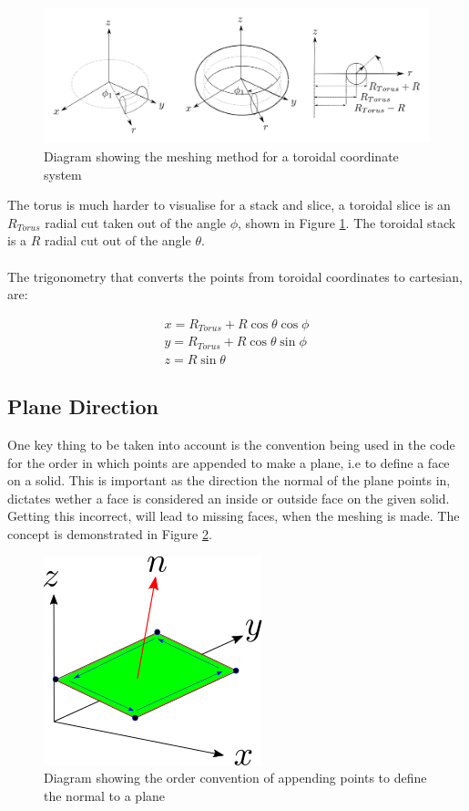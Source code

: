 \documentclass[12pt,a4paper]{article}
\begin{document}
\begin{figure}[h!]
\centering
\includegraphics[scale=0.35]{Images//Coords/torus_coords.png}
\caption[width=\columnwidth]{Diagram showing the meshing method for a toroidal coordinate system}
\label{tormeshin}
\end{figure}

The torus is much harder to visualise for a stack and slice, a toroidal slice is an $R_{Torus}$ radial cut taken out of the angle $\phi$, shown in Figure \ref{tormeshin}. The toroidal stack is a $R$ radial cut out of the angle $\theta$. 
\\\\
The trigonometry that converts the points from toroidal coordinates to cartesian, are:

\begin{equation}
\begin{split}
x = R_{Torus} + R\cos{\theta}\cos{\phi} \\
y = R_{Torus} + R\cos{\theta}\sin{\phi} \\
z =  R\sin{\theta} 
\end{split}
\end{equation}

\subsection{Plane Direction}
One key thing to be taken into account is the convention being used in the code for the order in which points are appended to make a plane, i.e to define a face on a solid. This is important as the direction the normal of the plane points in, dictates wether a face is considered an inside or outside face on the given solid. Getting this incorrect, will lead to missing faces, when the meshing is made. The concept is demonstrated in Figure \ref{pointsorder}.

\begin{figure}[h!]
\centering
\includegraphics[scale=0.75]{Images//append_points//Point_Appending_Order.png}
\caption[width=\columnwidth]{Diagram showing the order convention of appending points to define the normal to a plane}
\label{pointsorder}
\end{figure}
\end{document}
